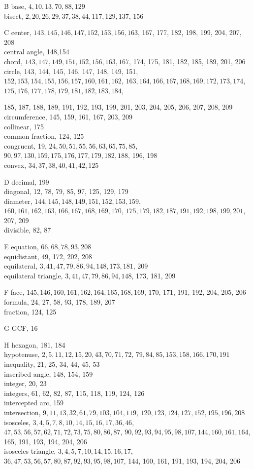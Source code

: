 \documentclass[10pt]{article}
\begin{document}
B
base, \(4,10,13,70,88,129\)\\
bisect, \(2,20,26,29,37,38,44,117,129,137\), 156

C
center, \(143,145,146,147,152,153,156,163\), 167, 177, 182, 198, 199, 204, 207, 208\\
central angle, 148,154\\
chord, \(143,147,149,151,152,156,163,167\), 174, 175, 181, 182, 185, 189, 201, 206\\
circle, 143, 144, 145, 146, 147, 148, 149, 151, \(152,153,154,155,156,157,160,161,162\), \(163,164,166,167,168,169,172,173,174\), \(175,176,177,178,179,181,182,183,184\),

185, 187, 188, 189, 191, 192, 193, 199, 201, 203, 204, 205, 206, 207, 208, 209\\
circumference, 145, 159, 161, 167, 203, 209\\
collinear, 175\\
common fraction, 124, 125\\
congruent, 19, \(24,50,51,55,56,63,65,75,85\), \(90,97,130,159,175,176,177,179,182,188\), 196, 198\\
convex, \(34,37,38,40,41,42,125\)

D
decimal, 199\\
diagonal, 12, 78, 79, 85, 97, 125, 129, 179\\
diameter, \(144,145,148,149,151,152,153,159\), \(160,161,162,163,166,167,168,169,170\), \(175,179,182,187,191,192,198,199,201\), 207, 209\\
divisible, 82, 87

E
equation, \(66,68,78,93,208\)\\
equidistant, 49, 172, 202, 208\\
equilateral, \(3,41,47,79,86,94,148,173,181\), 209\\
equilateral triangle, \(3,41,47,79,86,94,148\), 173, 181, 209

F
face, \(145,146,160,161,162,164,165,168,169\), 170, 171, 191, 192, 204, 205, 206\\
formula, 24, 27, 58, 93, 178, 189, 207\\
fraction, 124, 125

G
GCF, 16

H
hexagon, 181, 184\\
hypotenuse, \(2,5,11,12,15,20,43,70,71,72\), \(79,84,85,153,158,166,170,191\)\\
inequality, 21, 25, 34, 44, 45, 53\\
inscribed angle, 148, 154, 159\\
integer, 20, 23\\
integers, 61, 62, 82, 87, 115, 118, 119, 124, 126\\
intercepted arc, 159\\
intersection, \(9,11,13,32,61,79,103,104,119\), \(120,123,124,127,152,195,196,208\)\\
isosceles, \(3,4,5,7,8,10,14,15,16,17,36,46\), \(47,53,56,57,62,71,72,73,75,80,86,87\), \(90,92,93,94,95,98,107,144,160,161,164\), 165, 191, 193, 194, 204, 206\\
isosceles triangle, \(3,4,5,7,10,14,15,16,17\), \(36,47,53,56,57,80,87,92,93,95,98,107\), 144, 160, 161, 191, 193, 194, 204, 206
\end{document}
